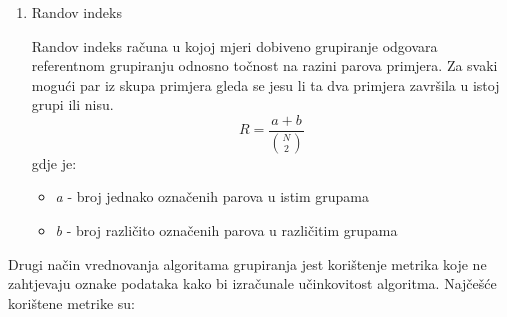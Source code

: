 \documentclass[utf8, diplomski, numeric]{fer}
\begin{document}
\begin{enumerate}
\item Randov indeks

Randov indeks računa u kojoj mjeri dobiveno grupiranje odgovara referentnom grupiranju odnosno točnost na razini parova primjera. Za svaki mogući par iz skupa primjera gleda se jesu li ta dva primjera
završila u istoj grupi ili nisu.
\begin{equation*} \label{eq:rand}
R =  \frac{a+b}{{N \choose 2}}
\end{equation*}
gdje je:
\begin{itemize}
\item \textit{a} - broj jednako označenih parova u istim grupama
\item \textit{b} - broj različito označenih parova u različitim grupama
\end{itemize}

\end{enumerate}

Drugi način vrednovanja algoritama grupiranja jest korištenje metrika koje ne zahtjevaju oznake podataka kako bi izračunale učinkovitost algoritma. Najčešće korištene metrike su:
\end{document}
